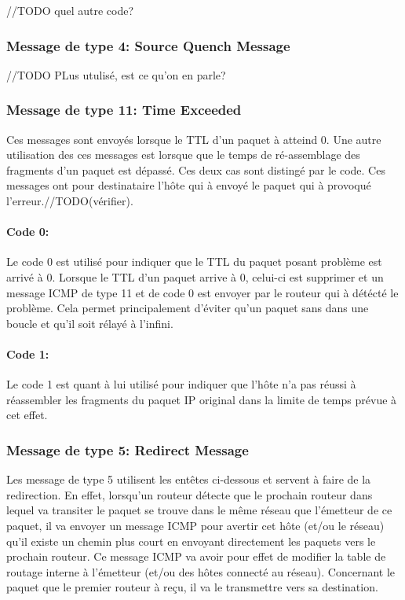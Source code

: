 //TODO quel autre code?



\subsubsection{Message de type 4: Source Quench Message}
//TODO PLus utulisé, est ce qu'on en parle?

\subsubsection{Message de type 11: Time Exceeded}
Ces messages sont envoyés lorsque le TTL d'un paquet à atteind 0. Une autre
utilisation des ces messages est lorsque que le temps de ré-assemblage des
fragments d'un paquet est dépassé. Ces deux cas sont distingé par le code. Ces
messages ont pour destinataire l'hôte qui à envoyé le paquet qui à provoqué
l'erreur.//TODO(vérifier).

\paragraph{Code 0:}
Le code 0 est utilisé pour indiquer que le TTL du paquet posant problème est arrivé à 0.
Lorsque le TTL d'un paquet arrive à 0, celui-ci est supprimer et un message
ICMP de type 11 et de code 0 est envoyer par le routeur qui à détécté le
problème. Cela permet principalement d'éviter qu'un paquet sans dans une boucle
et qu'il soit rélayé à l'infini.

\paragraph{Code 1:} Le code 1 est quant à lui utilisé pour indiquer que l'hôte n'a pas
réussi à réassembler les fragments du paquet IP original dans la limite de temps prévue
à cet effet.


\subsubsection{Message de type 5: Redirect Message} Les message de type 5 utilisent les entêtes
ci-dessous et servent à faire de la redirection. En effet, lorsqu'un routeur
détecte que le prochain routeur dans lequel va transiter le paquet se trouve
dans le même réseau que l'émetteur de ce paquet, il va envoyer un message ICMP
pour avertir cet hôte (et/ou le réseau) qu'il existe un chemin plus court en
envoyant directement les paquets vers le prochain routeur. Ce message ICMP va
avoir pour effet de modifier la table de routage interne à l'émetteur (et/ou
des hôtes connecté au réseau). Concernant le paquet que le premier routeur à
reçu, il va le transmettre vers sa destination.

